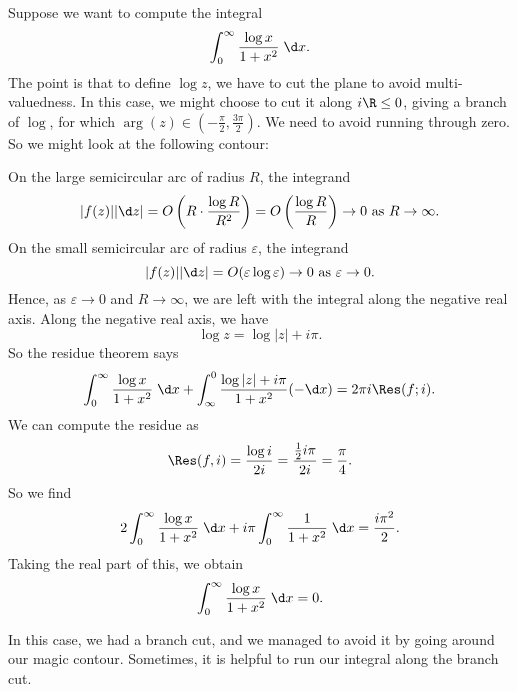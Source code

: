 \documentclass[a4paper]{article}
\begin{document}
\begin{eg}
  Suppose we want to compute the integral
  \[
    \int_0^\infty \frac{\log x}{1 + x^2}\;\d x.
  \]
  The point is that to define $\log z$, we have to cut the plane to avoid multi-valuedness. In this case, we might choose to cut it along $i \R\leq 0$, giving a branch of $\log$, for which $\arg(z) \in \left(-\frac{\pi}{2}, \frac{3\pi}{2}\right)$. We need to avoid running through zero. So we might look at the following contour:
  \begin{center}
  \end{center}
  On the large semicircular arc of radius $R$, the integrand
  \[
    |f(z)||\d z| = O\left(R \cdot \frac{\log R}{R^2}\right) = O\left(\frac{\log R}{R}\right) \to 0\text{ as }R \to \infty.
  \]
  On the small semicircular arc of radius $\varepsilon$, the integrand
  \[
    |f(z)| |\d z| = O(\varepsilon \log \varepsilon) \to 0\text{ as } \varepsilon \to 0.
  \]
  Hence, as $\varepsilon \to 0$ and $R \to \infty$, we are left with the integral along the negative real axis. Along the negative real axis, we have
  \[
    \log z = \log|z| + i \pi.
  \]
  So the residue theorem says
  \[
    \int_0^\infty \frac{\log x}{1 + x^2}\;\d x + \int_\infty^0 \frac{\log |z| + i\pi}{1 + x^2}(-\d x) = 2\pi i \Res(f; i).
  \]
  We can compute the residue as
  \[
    \Res(f, i) = \frac{\log i}{2i} = \frac{\frac{1}{2}i \pi}{2 i} = \frac{\pi}{4}.
  \]
  So we find
  \[
    2 \int_0^\infty \frac{\log x}{1 + x^2}\;\d x + i \pi \int_0^\infty \frac{1}{1 + x^2} \;\d x = \frac{i \pi ^2}{2}.
  \]
  Taking the real part of this, we obtain
  \[
    \int_0^\infty \frac{\log x}{1 + x^2}\;\d x = 0.
  \]
\end{eg}
In this case, we had a branch cut, and we managed to avoid it by going around our magic contour. Sometimes, it is helpful to run our integral along the branch cut.
\end{document}
